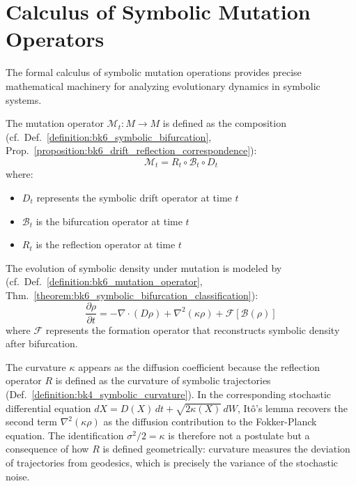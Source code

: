\section{Calculus of Symbolic Mutation Operators}
\label{sec:bk6_calculus_of_symbolic_mutation_operators}
The formal calculus of symbolic mutation operations provides precise mathematical machinery for analyzing evolutionary dynamics in symbolic systems.
\begin{definition}
\label{definition:bk6_mutation_operator}
The mutation operator $\mathcal{M}_t: M \to M$ is defined as the composition (cf.~Def.~\ref{definition:bk6_symbolic_bifurcation}, Prop.~\ref{proposition:bk6_drift_reflection_correspondence}):
\begin{equation}
\mathcal{M}_t = R_t \circ \mathcal{B}_t \circ D_t
\end{equation}
where:
\begin{itemize}
\item $D_t$ represents the symbolic drift operator at time $t$
\item $\mathcal{B}_t$ is the bifurcation operator at time $t$
\item $R_t$ is the reflection operator at time $t$
\end{itemize}
\end{definition}
\begin{definition}
\label{definition:bk6_symbolic_density_evolution}
The evolution of symbolic density under mutation is modeled by (cf.~Def.~\ref{definition:bk6_mutation_operator}, Thm.~\ref{theorem:bk6_symbolic_bifurcation_classification}):
\begin{equation}
\frac{\partial \rho}{\partial t} = -\nabla \cdot (D \rho) + \nabla^2(\kappa \rho) + \mathcal{F}[\mathcal{B}(\rho)]
\end{equation}
where $\mathcal{F}$ represents the formation operator that reconstructs symbolic density after bifurcation.
\end{definition}
\begin{remark}
The curvature $\kappa$ appears as the diffusion coefficient because the reflection operator $R$ is defined as the curvature of symbolic trajectories (Def.~\ref{definition:bk4_symbolic_curvature}). In the corresponding stochastic differential equation $dX = D(X)\,dt + \sqrt{2\kappa(X)}\,dW$, It\^{o}'s lemma recovers the second term $\nabla^2(\kappa\rho)$ as the diffusion contribution to the Fokker-Planck equation. The identification $\sigma^2/2 = \kappa$ is therefore not a postulate but a consequence of how $R$ is defined geometrically: curvature measures the deviation of trajectories from geodesics, which is precisely the variance of the stochastic noise.
\end{remark}
